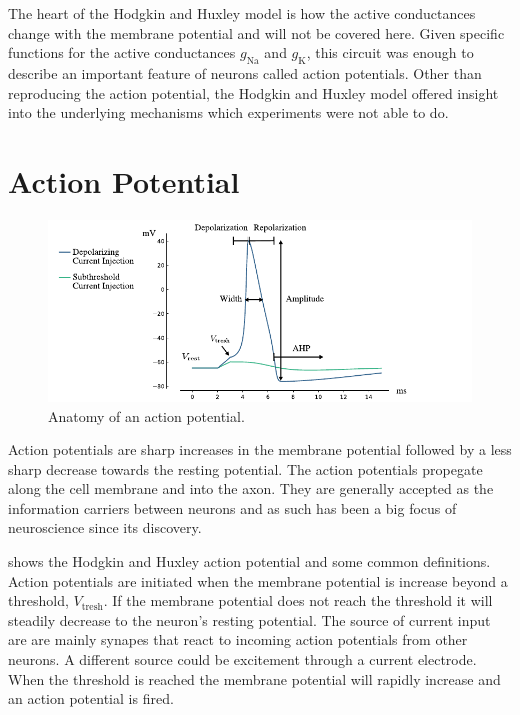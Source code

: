 \documentclass[altfont, fleqn]{uiophd}
\renewcommand{\Cref}[1]{{\color{viridis_03}\myCref{#1}}}
\begin{document}
The heart of the Hodgkin and Huxley model is 
how the active conductances change with the membrane potential
and will not be covered here. 
Given specific functions for the active conductances $g_\text{Na}$
and $g_\text{K}$, this circuit was enough to describe an important feature
of neurons called action potentials.
Other than reproducing the action potential, 
the Hodgkin and Huxley model offered insight
into the underlying mechanisms 
which experiments were not able to do.

\section{Action Potential}
\begin{figure}[h]
    \centering
    \includegraphics[width=\textwidth]{images/sec_2/action_potential.pdf}
    \caption{Anatomy of an action potential.
    }
    \label{fig:2_action_potential_anatomy}
\end{figure}

Action potentials are sharp increases in the membrane potential
followed by a less sharp decrease towards the resting potential. 
The action potentials propegate along the cell membrane and into
the axon. 
They are generally accepted as the information carriers between neurons
and as such has been a big focus of neuroscience since its discovery.

\Cref{fig:2_action_potential_anatomy} shows the Hodgkin and Huxley
action potential
and some common definitions. 
Action potentials are initiated when the membrane potential is increase
beyond a threshold, $V_\text{tresh}$. 
If the membrane potential does not reach the threshold it will steadily 
decrease to the neuron's resting potential. 
The source of current input are
are mainly synapes that react to incoming
action potentials from other neurons. 
A different source could be excitement through a current electrode. 
When the threshold is reached the membrane
potential will rapidly increase and an action potential is fired. 
\end{document}
